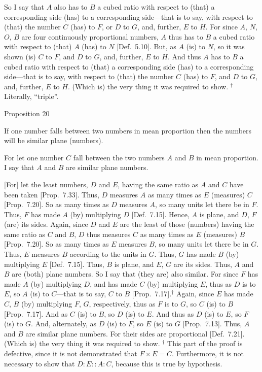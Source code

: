 So I say that $A$ also has to $B$ a cubed ratio with respect to (that)
a corresponding side (has) to a corresponding side---that is to say, with respect to (that) the number $C$ (has) to $F$, or $D$ to $G$, and, further,  $E$ to $H$. For
since $A$, $N$, $O$, $B$ are four continuously proportional numbers,
$A$ thus has to $B$	a cubed ratio with respect to (that) $A$ (has)
to $N$ [Def.~5.10]. But, as $A$ (is) to $N$, so
it was shown (is) $C$ to $F$, and $D$ to $G$, and, further, $E$ to $H$. And thus $A$ has to $B$ a cubed ratio with respect to (that) a corresponding
side (has) to a corresponding side---that is to say, with respect to
(that) the number $C$ (has) to $F$, and $D$ to $G$, and, further, $E$ to
$H$. (Which is) the very thing it was required to show.
{\footnotesize\noindent$^\dag$  Literally, ``triple''.}


\begin{center}
{\large Proposition 20}
\end{center}

If one number falls between two
numbers in mean proportion then the numbers will be similar plane (numbers).

For let one number $C$ fall  between the two numbers $A$
and $B$ in mean proportion. I say that $A$ and $B$ are similar plane numbers.

\epsfysize=1in
\centerline{}

\mbox{[}For] let the least numbers, $D$ and $E$,  having the same ratio as $A$ and $C$ have been taken [Prop.~7.33]. Thus,
$D$ measures $A$ as many  times as  $E$ (measures) $C$
[Prop.~7.20]. So as many times as $D$ measures $A$, so many units let there be in $F$. Thus, $F$ has made $A$ (by)
multiplying $D$ [Def.~7.15]. Hence, $A$ is 
plane, and $D$, $F$ (are) its sides. Again, since $D$ and $E$
are the least of those (numbers) having  the same ratio as $C$ and $B$, 
$D$ thus measures $C$ as many times as $E$ (measures) $B$ [Prop.~7.20]. So as many times as $E$ measures
$B$, so many units let there be in $G$. Thus, $E$ measures $B$ according to
the units in $G$. Thus, $G$ has made $B$ (by) multiplying $E$ [Def.~7.15]. Thus, $B$ is plane, and $E$, $G$ are its sides. Thus, $A$ and $B$ are (both) plane numbers. So I say that
(they are) also similar. For since $F$ has made $A$ (by) multiplying $D$,
and has made $C$ (by) multiplying $E$, thus as $D$ is to $E$, so $A$ (is) to $C$---that is to say, $C$ to $B$ [Prop.~7.17].$^\dag$ Again, since $E$ has made  $C$, $B$ (by)
multiplying  $F$, $G$, respectively, thus as $F$ is to $G$, so $C$ (is) to
$B$ [Prop.~7.17]. And as $C$ (is) to $B$, so
$D$ (is) to $E$. And thus as $D$ (is) to $E$, so $F$ (is) to $G$. And,
alternately, as $D$ (is) to $F$, so $E$ (is) to $G$ [Prop.~7.13]. Thus, $A$ and $B$ are similar plane
numbers. For their sides are proportional [Def.~7.21].
(Which is) the very thing it was required to show.
{\footnotesize\noindent$^\dag$ This part of the proof is defective, since it is not demonstrated that $F\times E = C$. Furthermore, it is
not necessary to show that $D:E::A:C$, because this
is true by hypothesis.}

